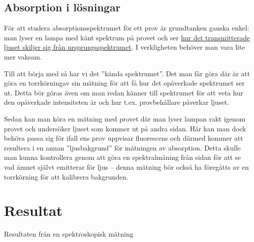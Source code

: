 \documentclass[11pt,a4paper]{article}
\begin{document}
\subsection{Absorption i lösningar}
För att studera absorptionsspektrumet för ett prov är grundtanken
ganska enkel: man lyser en lampa med känt spektrum på provet och ser
\href{https://xkcd.com/1517/}{hur det transmitterade ljuset skiljer
  sig från ursprungsspektrumet}. I verkligheten behöver man vara lite
mer vaksam. 

Till att börja med så har vi det ''kända spektrumet''. Det man får
göra där är att göra en torrkörning\footnotemark av sin mätning för
att få hur det opåverkade spektrumet ser ut. Detta bör göras även om
man redan känner till spektrumet för att veta hur den opåverkade
intensiteten är och hur t.ex. provbehållare påverkar ljuset. 

Sedan kan man köra en mätning med provet där man lyser lampan rakt
igenom provet och undersöker ljuset som kommer ut på andra sidan. Här
kan man dock behöva passa sig för ifall ens prov uppvisar fluorescens
och därmed kommer att resultera i en annan ''ljusbakgrund'' för
mätningen av absorption\cite{flour_spec}. Detta skulle man kunna
kontrollera genom att göra en spektralmäning från sidan för att se vad
ämnet självt emitterar för ljus -- denna mätning bör också ha
föregåtts av en torrkörning för att kalibrera bakgrunden. 




\section{Resultat}
Resultaten från en spektroskopisk mätning 
\end{document}
